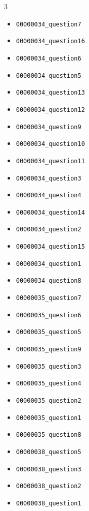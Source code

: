 \begin{multicols}{3}
\begin{itemize}[nosep, leftmargin=*]
        \item \texttt{00000034\_question7}
        \item \texttt{00000034\_question16}
        \item \texttt{00000034\_question6}
        \item \texttt{00000034\_question5}
        \item \texttt{00000034\_question13}
        \item \texttt{00000034\_question12}
        \item \texttt{00000034\_question9}
        \item \texttt{00000034\_question10}
        \item \texttt{00000034\_question11}
        \item \texttt{00000034\_question3}
        \item \texttt{00000034\_question4}
        \item \texttt{00000034\_question14}
        \item \texttt{00000034\_question2}
        \item \texttt{00000034\_question15}
        \item \texttt{00000034\_question1}
        \item \texttt{00000034\_question8}
        
        

        \item \texttt{00000035\_question7}
        \item \texttt{00000035\_question6}
        \item \texttt{00000035\_question5}
        \item \texttt{00000035\_question9}
        \item \texttt{00000035\_question3}
        \item \texttt{00000035\_question4}
        \item \texttt{00000035\_question2}
        \item \texttt{00000035\_question1}
        \item \texttt{00000035\_question8}
        
        

        \item \texttt{00000038\_question5}
        \item \texttt{00000038\_question3}
        \item \texttt{00000038\_question2}
        \item \texttt{00000038\_question1}
        

\end{itemize}
\end{multicols}
